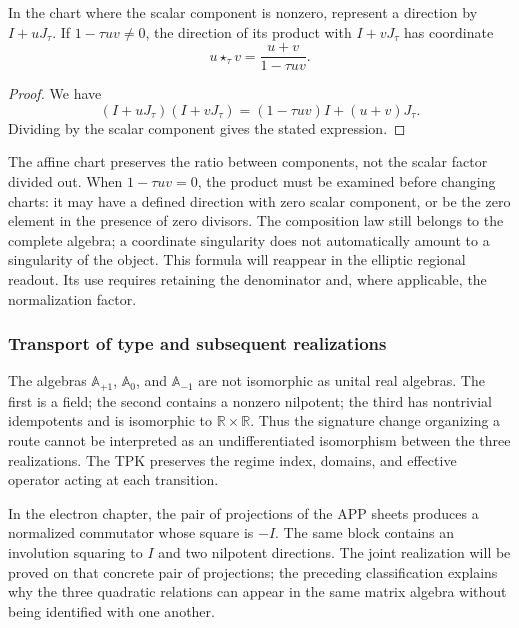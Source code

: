 \begin{proposition}
\label{trit-ampl-prop-pendientes}
In the chart where the scalar component is nonzero, represent a
direction by \(I+uJ_\tau\). If \(1-\tau uv\ne0\), the direction of its
product with \(I+vJ_\tau\) has coordinate
\[
 u\star_\tau v=\frac{u+v}{1-\tau uv}.
\]
\end{proposition}
\begin{proof}
We have
\[
 (I+uJ_\tau)(I+vJ_\tau)
   =(1-\tau uv)I+(u+v)J_\tau.
\]
Dividing by the scalar component gives the stated expression.
\end{proof}

The affine chart preserves the ratio between components, not the scalar factor
divided out. When \(1-\tau uv=0\), the product must be examined before
changing charts: it may have a defined direction with zero scalar
component, or be the zero element in the presence of zero divisors. The composition
law still belongs to the complete algebra; a coordinate singularity
does not automatically amount to a singularity of the object.
This formula will reappear in the elliptic regional readout. Its use requires
retaining the denominator and, where applicable, the normalization factor.

\subsubsection{Transport of type and subsequent realizations}
\label{trit-ampl-puentes}

The algebras \(\mathbb A_{+1}\), \(\mathbb A_0\), and
\(\mathbb A_{-1}\) are not isomorphic as unital real algebras.
The first is a field; the second contains a nonzero nilpotent; the
third has nontrivial idempotents and is isomorphic to
\(\mathbb R\times\mathbb R\). Thus the signature change organizing a
route cannot be interpreted as an undifferentiated isomorphism between the
three realizations. The TPK preserves the regime index, domains, and
effective operator acting at each transition.

In the electron chapter, the pair of projections of the APP sheets
produces a normalized commutator whose square is \(-I\). The same block
contains an involution squaring to \(I\) and two nilpotent directions. The
joint realization will be proved on that concrete pair of projections;
the preceding classification explains why the three quadratic relations
can appear in the same matrix algebra without being identified with one another.

